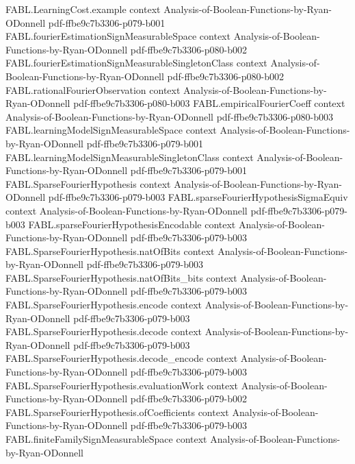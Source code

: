 \begin{theorem}
\proofstep
  {FABL.LearningCost.example}
  {context}
  {Analysis-of-Boolean-Functions-by-Ryan-ODonnell}
  {pdf-ffbe9c7b3306-p079-b001}
\proofstep
  {FABL.fourierEstimationSignMeasurableSpace}
  {context}
  {Analysis-of-Boolean-Functions-by-Ryan-ODonnell}
  {pdf-ffbe9c7b3306-p080-b002}
\proofstep
  {FABL.fourierEstimationSignMeasurableSingletonClass}
  {context}
  {Analysis-of-Boolean-Functions-by-Ryan-ODonnell}
  {pdf-ffbe9c7b3306-p080-b002}
\proofstep
  {FABL.rationalFourierObservation}
  {context}
  {Analysis-of-Boolean-Functions-by-Ryan-ODonnell}
  {pdf-ffbe9c7b3306-p080-b003}
\proofstep
  {FABL.empiricalFourierCoeff}
  {context}
  {Analysis-of-Boolean-Functions-by-Ryan-ODonnell}
  {pdf-ffbe9c7b3306-p080-b003}
\proofstep
  {FABL.learningModelSignMeasurableSpace}
  {context}
  {Analysis-of-Boolean-Functions-by-Ryan-ODonnell}
  {pdf-ffbe9c7b3306-p079-b001}
\proofstep
  {FABL.learningModelSignMeasurableSingletonClass}
  {context}
  {Analysis-of-Boolean-Functions-by-Ryan-ODonnell}
  {pdf-ffbe9c7b3306-p079-b001}
\proofstep
  {FABL.SparseFourierHypothesis}
  {context}
  {Analysis-of-Boolean-Functions-by-Ryan-ODonnell}
  {pdf-ffbe9c7b3306-p079-b003}
\proofstep
  {FABL.sparseFourierHypothesisSigmaEquiv}
  {context}
  {Analysis-of-Boolean-Functions-by-Ryan-ODonnell}
  {pdf-ffbe9c7b3306-p079-b003}
\proofstep
  {FABL.sparseFourierHypothesisEncodable}
  {context}
  {Analysis-of-Boolean-Functions-by-Ryan-ODonnell}
  {pdf-ffbe9c7b3306-p079-b003}
\proofstep
  {FABL.SparseFourierHypothesis.natOfBits}
  {context}
  {Analysis-of-Boolean-Functions-by-Ryan-ODonnell}
  {pdf-ffbe9c7b3306-p079-b003}
\proofstep
  {FABL.SparseFourierHypothesis.natOfBits_bits}
  {context}
  {Analysis-of-Boolean-Functions-by-Ryan-ODonnell}
  {pdf-ffbe9c7b3306-p079-b003}
\proofstep
  {FABL.SparseFourierHypothesis.encode}
  {context}
  {Analysis-of-Boolean-Functions-by-Ryan-ODonnell}
  {pdf-ffbe9c7b3306-p079-b003}
\proofstep
  {FABL.SparseFourierHypothesis.decode}
  {context}
  {Analysis-of-Boolean-Functions-by-Ryan-ODonnell}
  {pdf-ffbe9c7b3306-p079-b003}
\proofstep
  {FABL.SparseFourierHypothesis.decode_encode}
  {context}
  {Analysis-of-Boolean-Functions-by-Ryan-ODonnell}
  {pdf-ffbe9c7b3306-p079-b003}
\proofstep
  {FABL.SparseFourierHypothesis.evaluationWork}
  {context}
  {Analysis-of-Boolean-Functions-by-Ryan-ODonnell}
  {pdf-ffbe9c7b3306-p079-b002}
\proofstep
  {FABL.SparseFourierHypothesis.ofCoefficients}
  {context}
  {Analysis-of-Boolean-Functions-by-Ryan-ODonnell}
  {pdf-ffbe9c7b3306-p079-b003}
\proofstep
  {FABL.finiteFamilySignMeasurableSpace}
  {context}
  {Analysis-of-Boolean-Functions-by-Ryan-ODonnell}

\end{theorem}
